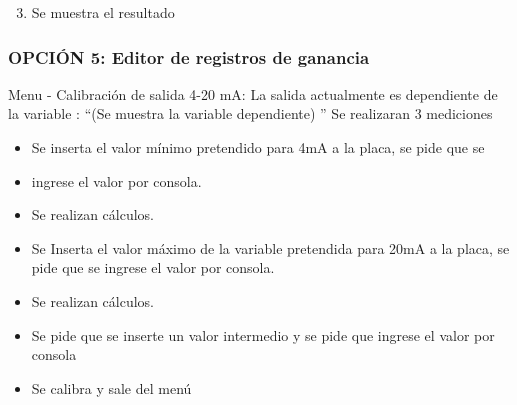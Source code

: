 \begin{enumerate}
\setcounter{enumi}{2}
\item Se muestra el resultado
\end{enumerate}

\subsubsection{OPCIÓN 5: Editor de registros de ganancia}
Menu - Calibración de salida 4-20 mA:
La salida actualmente es dependiente de la variable : “(Se muestra la variable dependiente) ”
Se realizaran 3 mediciones

\begin{itemize}
\item Se inserta el valor mínimo pretendido para 4mA a la placa, se pide que se \item ingrese el valor por consola.
\item Se realizan cálculos.
\item Se Inserta el valor máximo de la variable pretendida para 20mA a la placa, se pide que se ingrese el valor por consola.
\item Se realizan cálculos.
\item Se pide que se inserte un valor intermedio y se pide que ingrese el valor por consola
\item Se calibra y sale del menú

\end{itemize}


